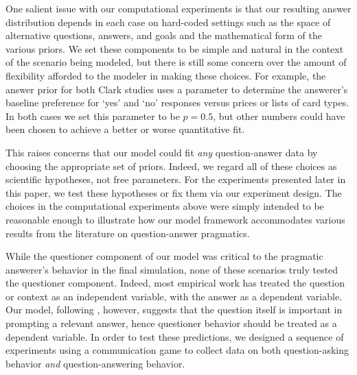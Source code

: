 \documentclass[12pt, floatsintext, jou]{apa6}
\begin{document}
One salient issue with our computational experiments is that our resulting answer distribution depends in each case on hard-coded settings such as the space of alternative questions, answers, and goals and the mathematical form of the various priors. We set these components to be simple and natural in the context of the scenario being modeled, but there is still some concern over the amount of flexibility afforded to the modeler in making these choices. For example, the answer prior for both Clark studies uses a parameter to determine the answerer's baseline preference for `yes' and `no' responses versus prices or lists of card types. In both cases we set this parameter to be $p = 0.5$, but other numbers could have been chosen to achieve a better or worse quantitative fit. 

This raises concerns that our model could fit \emph{any} question-answer data by choosing the appropriate set of priors. Indeed, we regard all of these choices as scientific hypotheses, not free parameters. For the experiments presented later in this paper, we test these hypotheses or fix them via our experiment design. The choices in the computational experiments above were simply intended to be reasonable enough to illustrate how our model framework accommodates various results from the literature on question-answer pragmatics.

While the questioner component of our model was critical to the pragmatic answerer's behavior in the final simulation, none of these scenarios truly tested the questioner component.  Indeed, most empirical work has treated the question or context as an independent variable, with the answer as a dependent variable. Our model, following , however, suggests that the question itself is important in prompting a relevant answer, hence questioner behavior should be treated as a dependent variable. In order to test these predictions, we designed a sequence of experiments using a communication game to collect data on both question-asking behavior \emph{and} question-answering behavior.
\end{document}
